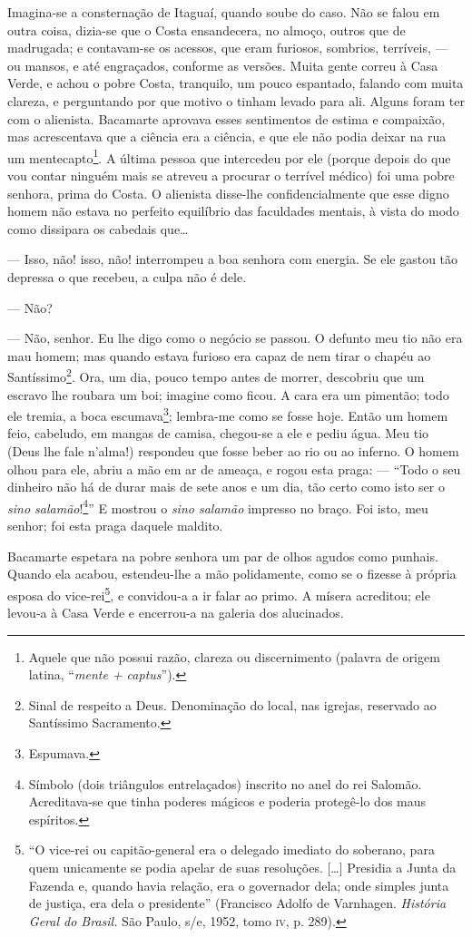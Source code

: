 Imagina-se a consternação de Itaguaí, quando soube do caso. Não se falou
em outra coisa, dizia-se que o Costa ensandecera, no almoço, outros que
de madrugada; e contavam-se os acessos, que eram furiosos, sombrios,
terríveis, --- ou mansos, e até engraçados, conforme as versões. Muita
gente correu à Casa Verde, e achou o pobre Costa, tranquilo, um pouco
espantado, falando com muita clareza, e perguntando por que motivo o
tinham levado para ali. Alguns foram ter com o alienista. Bacamarte
aprovava esses sentimentos de estima e compaixão, mas acrescentava que a
ciência era a ciência, e que ele não podia deixar na rua um
mentecapto\footnote{Aquele que não possui razão, clareza ou
  discernimento (palavra de origem latina, ``\emph{mente + captus}'').}.
A última pessoa que intercedeu por ele (porque depois do que vou contar
ninguém mais se atreveu a procurar o terrível médico) foi uma pobre
senhora, prima do Costa. O alienista disse-lhe confidencialmente que
esse digno homem não estava no perfeito equilíbrio das faculdades
mentais, à vista do modo como dissipara os cabedais que\ldots{}

--- Isso, não! isso, não! interrompeu a boa senhora com energia. Se ele
gastou tão depressa o que recebeu, a culpa não é dele.

--- Não?

--- Não, senhor. Eu lhe digo como o negócio se passou. O defunto meu tio
não era mau homem; mas quando estava furioso era capaz de nem tirar o
chapéu ao Santíssimo\footnote{Sinal de respeito a Deus. Denominação do
  local, nas igrejas, reservado ao Santíssimo Sacramento.}. Ora, um dia,
pouco tempo antes de morrer, descobriu que um escravo lhe roubara um
boi; imagine como ficou. A cara era um pimentão; todo ele tremia, a boca
escumava\footnote{Espumava.}; lembra-me como se fosse hoje. Então um
homem feio, cabeludo, em mangas de camisa, chegou-se a ele e pediu água.
Meu tio (Deus lhe fale n'alma!) respondeu que fosse beber ao rio ou ao
inferno. O homem olhou para ele, abriu a mão em ar de ameaça, e rogou
esta praga: --- ``Todo o seu dinheiro não há de durar mais de sete anos
e um dia, tão certo como isto ser o \emph{sino salamão}!\footnote{Símbolo
  (dois triângulos entrelaçados) inscrito no anel do rei Salomão.
  Acreditava-se que tinha poderes mágicos e poderia protegê-lo dos maus
  espíritos.}'' E mostrou o \emph{sino salamão} impresso no braço. Foi
isto, meu senhor; foi esta praga daquele maldito.

Bacamarte espetara na pobre senhora um par de olhos agudos como punhais.
Quando ela acabou, estendeu-lhe a mão polidamente, como se o fizesse à
própria esposa do vice-rei\footnote{``O vice-rei ou capitão-general era
  o delegado imediato do soberano, para quem unicamente se podia apelar
  de suas resoluções. {[}\ldots{}{]} Presidia a Junta da Fazenda e,
  quando havia relação, era o governador dela; onde simples junta de
  justiça, era dela o presidente'' (Francisco Adolfo de Varnhagen.
  \emph{História Geral do Brasil.} São Paulo, s/e, 1952, tomo \textsc{iv}, p.
  289).}, e convidou-a a ir falar ao primo. A mísera acreditou; ele
levou-a à Casa Verde e encerrou-a na galeria dos alucinados.

